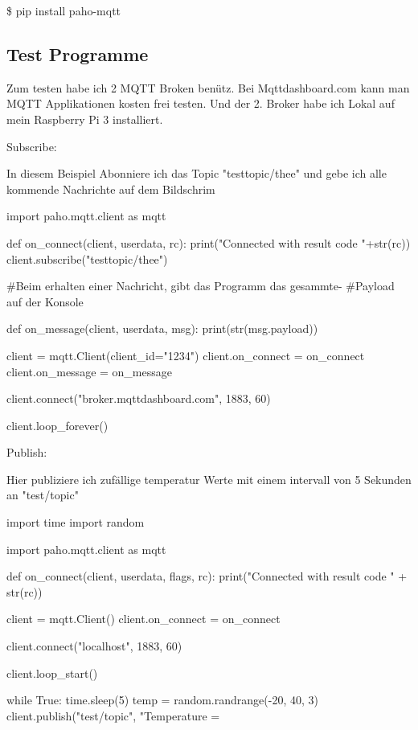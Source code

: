 \begin{tcolorbox}[colback=green!5,colframe=green!40!black,title=Installation]
\$ pip install paho-mqtt
\end{tcolorbox}
	
\subsection{Test Programme}
Zum testen habe ich 2 MQTT Broken benütz. Bei Mqttdashboard.com kann man MQTT Applikationen kosten frei testen. Und der 2. Broker habe ich Lokal auf mein Raspberry Pi 3 installiert.

\pagebreak

Subscribe:

In diesem Beispiel Abonniere ich das Topic "testtopic/thee" und gebe ich alle kommende Nachrichte auf dem Bildschrim

\begin{python}
import paho.mqtt.client as mqtt

def on_connect(client, userdata, rc):
    print("Connected with result code "+str(rc))
    client.subscribe("testtopic/thee")

#Beim erhalten einer Nachricht, gibt das Programm das gesammte-
#Payload auf der Konsole

def on_message(client, userdata, msg):
    print(str(msg.payload))

client = mqtt.Client(client_id="1234")
client.on_connect = on_connect
client.on_message = on_message

client.connect("broker.mqttdashboard.com", 1883, 60)

client.loop_forever()
\end{python}

Publish:

Hier publiziere ich zufällige temperatur Werte mit einem intervall von 5 Sekunden an "test/topic"

\begin{python}
import time
import random

import paho.mqtt.client as mqtt

def on_connect(client, userdata, flags, rc):
    print("Connected with result code " + str(rc))

client = mqtt.Client()
client.on_connect = on_connect

client.connect("localhost", 1883, 60)

client.loop_start()

while True:
    time.sleep(5)
    temp = random.randrange(-20, 40, 3)
    client.publish("test/topic", "Temperature = %
\end{python}

